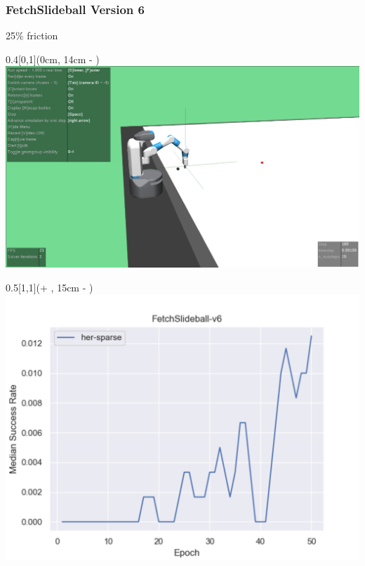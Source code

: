 




\begin{frame}
	\frametitle{FetchSlideball Version 6}	
	\vspace{1cm}
	
	25\% friction
	
	\begin{textblock*}{0.4\paperwidth}[0,1](0cm, 14cm - \PraesentationSeitenrand)%
		\includegraphics[width=0.4\paperwidth]{./Ressourcen/Figures/FetchSlideball-v3.pdf}
	\end{textblock*}
	
	\begin{textblock*}{0.5\paperwidth}[1,1](\textwidth + \PraesentationSeitenrand, 15cm - \PraesentationSeitenrand)%
		\includegraphics[width=0.5\paperwidth]{./Ressourcen/Figures/fig_FetchSlideball-v6.pdf}
	\end{textblock*}
	
	
\end{frame}
\clearpage

